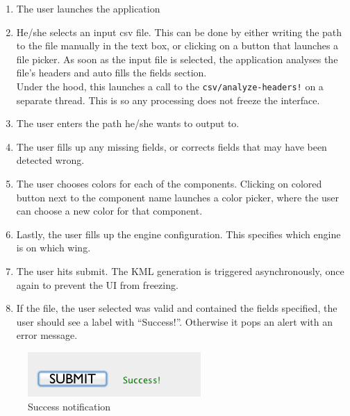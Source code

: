 \begin{enumerate}
\item The user launches the application
\item He/she selects an input csv file. This can be done by either writing the path to the file manually in the text box, or clicking on a button that launches a file picker. As soon as the input file is selected, the application analyses the file's headers and auto fills the fields section. \\
Under the hood, this launches a call to the \lstinline{csv/analyze-headers!} on a separate thread. This is so any processing does not freeze the interface.
\item The user enters the path he/she wants to output to.
\item The user fills up any missing fields, or corrects fields that may have been detected wrong.
\item The user chooses colors for each of the components. Clicking on colored button next to the component name launches a color picker, where the user can choose a new color for that component.
\item Lastly, the user fills up the engine configuration. This specifies which engine is on which wing.
\item The user hits submit. The KML generation is triggered asynchronously, once again to prevent the UI from freezing.
\item If the file, the user selected was valid and contained the fields specified, the user should see a label with ``Success!''. Otherwise it pops an alert with an error message.
\end{enumerate}

\begin{figure}[h]
\centering
  \includegraphics[scale=0.5]{gfx/ui-success.png}
\caption{Success notification}
\end{figure}
